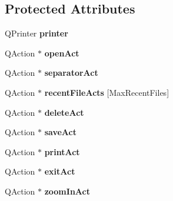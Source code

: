 \subsection*{Protected Attributes}
\begin{DoxyCompactItemize}
\item 
\hypertarget{classofeli_1_1_image_viewer_a68e92a3ca2f036c71850b90b2ef5cc60}{Q\-Printer {\bfseries printer}}\label{classofeli_1_1_image_viewer_a68e92a3ca2f036c71850b90b2ef5cc60}

\item 
\hypertarget{classofeli_1_1_image_viewer_af74c20facb2019ec466df6711b603c54}{Q\-Action $\ast$ {\bfseries open\-Act}}\label{classofeli_1_1_image_viewer_af74c20facb2019ec466df6711b603c54}

\item 
\hypertarget{classofeli_1_1_image_viewer_ae15f7be361756e444e9008a2d2ecf7af}{Q\-Action $\ast$ {\bfseries separator\-Act}}\label{classofeli_1_1_image_viewer_ae15f7be361756e444e9008a2d2ecf7af}

\item 
\hypertarget{classofeli_1_1_image_viewer_aeb845361ec50131ea5cac363be0596b7}{Q\-Action $\ast$ {\bfseries recent\-File\-Acts} \mbox{[}Max\-Recent\-Files\mbox{]}}\label{classofeli_1_1_image_viewer_aeb845361ec50131ea5cac363be0596b7}

\item 
\hypertarget{classofeli_1_1_image_viewer_adc303e02c43f3a116d5213746c8d21ab}{Q\-Action $\ast$ {\bfseries delete\-Act}}\label{classofeli_1_1_image_viewer_adc303e02c43f3a116d5213746c8d21ab}

\item 
\hypertarget{classofeli_1_1_image_viewer_a81707a5ca469a9fc0cbbf01edea05e0d}{Q\-Action $\ast$ {\bfseries save\-Act}}\label{classofeli_1_1_image_viewer_a81707a5ca469a9fc0cbbf01edea05e0d}

\item 
\hypertarget{classofeli_1_1_image_viewer_a2ec9531595fff5b1829ffec0cf7a9b70}{Q\-Action $\ast$ {\bfseries print\-Act}}\label{classofeli_1_1_image_viewer_a2ec9531595fff5b1829ffec0cf7a9b70}

\item 
\hypertarget{classofeli_1_1_image_viewer_af15390b9a5fde117a030fd71d6ba71c7}{Q\-Action $\ast$ {\bfseries exit\-Act}}\label{classofeli_1_1_image_viewer_af15390b9a5fde117a030fd71d6ba71c7}

\item 
\hypertarget{classofeli_1_1_image_viewer_aa55a59e9a962438e2f1cf9e3c662df87}{Q\-Action $\ast$ {\bfseries zoom\-In\-Act}}\label{classofeli_1_1_image_viewer_aa55a59e9a962438e2f1cf9e3c662df87}


\end{DoxyCompactItemize}
